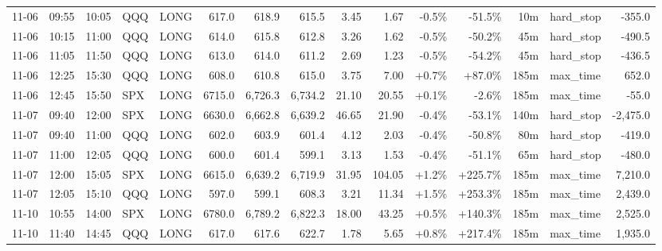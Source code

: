 \documentclass[11pt,a4paper,twoside]{article}
\begin{document}
\begin{landscape}
\begin{center}
\begin{longtable}{>{\color{txtmain}}l l l l l r r r r r r r r >{\color{txtmain}}l r}
11-06 & 09:55 & 10:05 & QQQ & LONG & 617.0 & 618.9 & 615.5 & 3.45 & 1.67 & \textcolor{lossred}{-0.5\%} & \textcolor{lossred}{-51.5\%} & 10m & hard\_stop & \textcolor{lossred}{-355.0} \\
11-06 & 10:15 & 11:00 & QQQ & LONG & 614.0 & 615.8 & 612.8 & 3.26 & 1.62 & \textcolor{lossred}{-0.5\%} & \textcolor{lossred}{-50.2\%} & 45m & hard\_stop & \textcolor{lossred}{-490.5} \\
11-06 & 11:05 & 11:50 & QQQ & LONG & 613.0 & 614.0 & 611.2 & 2.69 & 1.23 & \textcolor{lossred}{-0.5\%} & \textcolor{lossred}{-54.2\%} & 45m & hard\_stop & \textcolor{lossred}{-436.5} \\
11-06 & 12:25 & 15:30 & QQQ & LONG & 608.0 & 610.8 & 615.0 & 3.75 & 7.00 & \textcolor{wingreen}{+0.7\%} & \textcolor{wingreen}{+87.0\%} & 185m & max\_time & \textcolor{wingreen}{652.0} \\
11-06 & 12:45 & 15:50 & SPX & LONG & 6715.0 & 6,726.3 & 6,734.2 & 21.10 & 20.55 & \textcolor{wingreen}{+0.1\%} & \textcolor{lossred}{-2.6\%} & 185m & max\_time & \textcolor{lossred}{-55.0} \\
11-07 & 09:40 & 12:00 & SPX & LONG & 6630.0 & 6,662.8 & 6,639.2 & 46.65 & 21.90 & \textcolor{lossred}{-0.4\%} & \textcolor{lossred}{-53.1\%} & 140m & hard\_stop & \textcolor{lossred}{-2,475.0} \\
11-07 & 09:40 & 11:00 & QQQ & LONG & 602.0 & 603.9 & 601.4 & 4.12 & 2.03 & \textcolor{lossred}{-0.4\%} & \textcolor{lossred}{-50.8\%} & 80m & hard\_stop & \textcolor{lossred}{-419.0} \\
11-07 & 11:00 & 12:05 & QQQ & LONG & 600.0 & 601.4 & 599.1 & 3.13 & 1.53 & \textcolor{lossred}{-0.4\%} & \textcolor{lossred}{-51.1\%} & 65m & hard\_stop & \textcolor{lossred}{-480.0} \\
11-07 & 12:00 & 15:05 & SPX & LONG & 6615.0 & 6,639.2 & 6,719.9 & 31.95 & 104.05 & \textcolor{wingreen}{+1.2\%} & \textcolor{wingreen}{+225.7\%} & 185m & max\_time & \textcolor{wingreen}{7,210.0} \\
11-07 & 12:05 & 15:10 & QQQ & LONG & 597.0 & 599.1 & 608.3 & 3.21 & 11.34 & \textcolor{wingreen}{+1.5\%} & \textcolor{wingreen}{+253.3\%} & 185m & max\_time & \textcolor{wingreen}{2,439.0} \\
11-10 & 10:55 & 14:00 & SPX & LONG & 6780.0 & 6,789.2 & 6,822.3 & 18.00 & 43.25 & \textcolor{wingreen}{+0.5\%} & \textcolor{wingreen}{+140.3\%} & 185m & max\_time & \textcolor{wingreen}{2,525.0} \\
11-10 & 11:40 & 14:45 & QQQ & LONG & 617.0 & 617.6 & 622.7 & 1.78 & 5.65 & \textcolor{wingreen}{+0.8\%} & \textcolor{wingreen}{+217.4\%} & 185m & max\_time & \textcolor{wingreen}{1,935.0} \\

\end{longtable}
\end{center}
\end{landscape}
\end{document}
